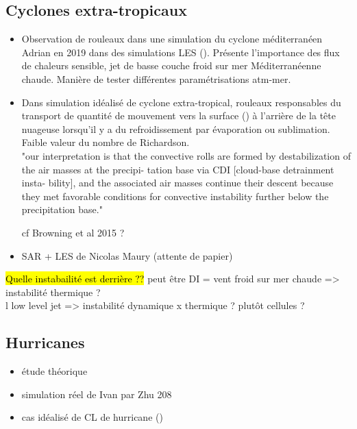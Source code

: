 \subsection{Cyclones extra-tropicaux}
\begin{itemize}
\item Observation de rouleaux dans une simulation du cyclone méditerranéen Adrian en 2019 dans des simulations LES (\cite{lfarhImpactSurfaceTurbulent2024}). Présente l'importance des flux de chaleurs sensible, jet de basse couche froid sur mer Méditerranéenne chaude. Manière de tester différentes paramétrisations atm-mer. 

\item Dans simulation idéalisé de cyclone extra-tropical, rouleaux responsables du transport de quantité de mouvement vers la surface (\cite{riviereDownwardTransportMomentum2020}) à l'arrière de la tête nuageuse lorsqu'il y a du refroidissement par évaporation ou sublimation. Faible valeur du nombre de Richardson.  \\

"our interpretation is that the convective rolls are
formed by destabilization of the air masses at the precipi-
tation base via CDI [cloud-base detrainment insta-
bility], and the associated air masses continue
their descent because they met favorable conditions for
convective instability further below the precipitation base."

cf Browning et al 2015 ?

\item SAR + LES de Nicolas Maury (attente de papier)
\end{itemize}




\hl{Quelle instabailité est derrière ??}
peut être DI = vent froid sur mer chaude  => instabilité thermique ? \\l
low level jet => instabilité dynamique x thermique ? 
plutôt cellules ? 

\subsection{Hurricanes}
\begin{itemize}
	\item  étude théorique \cite{foster2005}
	\item simulation réel de Ivan par Zhu 208
	\item cas idéalisé de CL de hurricane (\cite{nakanishiLargeEddySimulationRoll2012})
\end{itemize}



